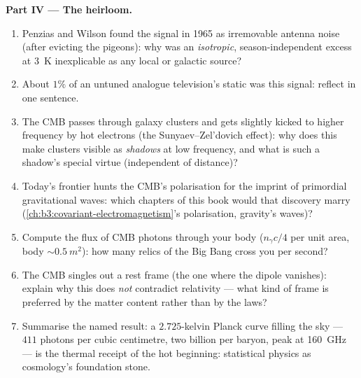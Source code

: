 \begin{problem}
\medskip\noindent\textbf{Part IV --- The heirloom.}
\begin{enumerate}[resume]
  \item Penzias and Wilson found the signal in 1965 as
        irremovable antenna noise (after evicting the pigeons):
        why was an \emph{isotropic}, season-independent excess at
        \qty{3}{K} inexplicable as any local or galactic source?
  \item About $1\%$ of an untuned analogue television's static
        was this signal: reflect in one sentence.
  \item The CMB passes through galaxy clusters and gets slightly
        kicked to higher frequency by hot electrons (the
        Sunyaev--Zel'dovich effect): why does this make clusters
        visible as \emph{shadows} at low frequency, and what is
        such a shadow's special virtue (independent of
        distance)?
  \item Today's frontier hunts the CMB's polarisation for the
        imprint of primordial gravitational waves: which chapters
        of this book would that discovery marry
        (\cref{ch:b3:covariant-electromagnetism}'s polarisation,
        gravity's waves)?
  \item Compute the flux of CMB photons through your body
        ($n_\gamma c/4$ per unit area, body 
        $\sim\qty{0.5}{m^2}$): how many relics of the Big Bang
        cross you per second?
  \item The CMB singles out a rest frame (the one where the
        dipole vanishes): explain why this does \emph{not}
        contradict relativity --- what kind of frame is preferred
        by the matter content rather than by the laws?
  \item Summarise the named result: a $2.725$-kelvin Planck
        curve filling the sky --- $411$ photons per cubic
        centimetre, two billion per baryon, peak at
        \qty{160}{GHz} --- is the thermal receipt of the hot
        beginning: statistical physics as cosmology's foundation
        stone.
\end{enumerate}
\end{problem}

